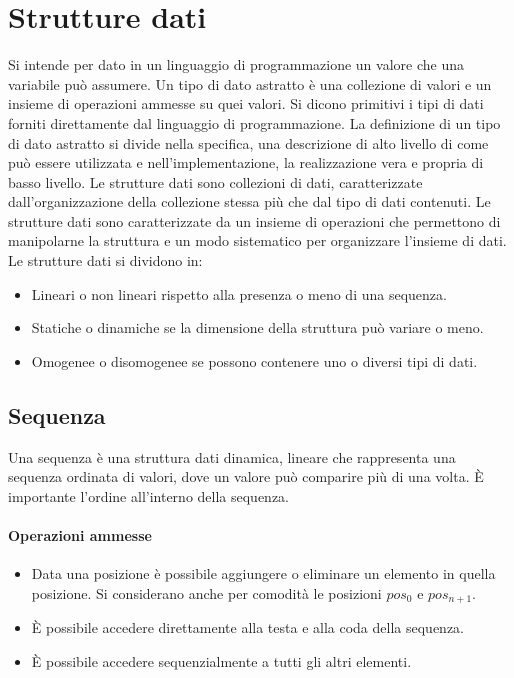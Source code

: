 \chapter{Strutture dati}
Si intende per dato in un linguaggio di programmazione un valore che una variabile pu\`o assumere. Un tipo di dato astratto \`e una collezione di valori e un
insieme di operazioni ammesse su quei valori. Si dicono primitivi i tipi di dati forniti direttamente dal linguaggio di programmazione. La definizione di un
tipo di dato astratto si divide nella specifica, una descrizione di alto livello di come pu\`o essere utilizzata e nell'implementazione, la realizzazione
vera e propria di basso livello. Le strutture dati sono collezioni di dati, caratterizzate dall'organizzazione della collezione stessa pi\`u che dal tipo di
dati contenuti. Le strutture dati sono caratterizzate da un insieme di operazioni che permettono di manipolarne la struttura e un modo sistematico per
organizzare l'insieme di dati. Le strutture dati si dividono in:
\begin{itemize}
    \item Lineari o non lineari rispetto alla presenza o meno di una sequenza.
    \item Statiche o dinamiche se la dimensione della struttura pu\`o variare o meno.
    \item Omogenee o disomogenee se possono contenere uno o diversi tipi di dati.
\end{itemize}
\section{Sequenza}
Una sequenza \`e una struttura dati dinamica, lineare che rappresenta una sequenza ordinata di valori, dove un valore pu\`o comparire pi\`u di una volta. \`E
importante l'ordine all'interno della sequenza.
\subsubsection{Operazioni ammesse}
\begin{itemize}
    \item Data una posizione \`e possibile aggiungere o eliminare un elemento in quella posizione. Si considerano anche per comodit\`a le posizioni $pos_0$ e
          $pos_{n+1}$.
    \item \`E possibile accedere direttamente alla testa e alla coda della sequenza.
    \item \`E possibile accedere sequenzialmente a tutti gli altri elementi.
\end{itemize}
